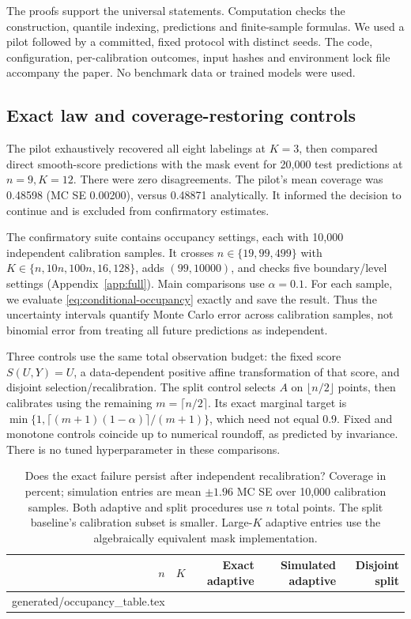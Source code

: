 \documentclass{article}
\makeatletter
\newcommand{\inputtable}[1]{\@@input#1 }
\makeatother
\begin{document}
The proofs support the universal statements. Computation checks the construction, quantile indexing, predictions and finite-sample formulas. We used a pilot followed by a committed, fixed protocol with distinct seeds. The code, configuration, per-calibration outcomes, input hashes and environment lock file accompany the paper. No benchmark data or trained models were used.

\subsection{Exact law and coverage-restoring controls}

The pilot exhaustively recovered all eight labelings at $K=3$, then compared direct smooth-score predictions with the mask event for 20,000 test predictions at $n=9,K=12$. There were zero disagreements. The pilot's mean coverage was 0.48598 (MC SE 0.00200), versus 0.48871 analytically. It informed the decision to continue and is excluded from confirmatory estimates.

The confirmatory suite contains \NumOccupancyCases{} occupancy settings, each with 10,000 independent calibration samples. It crosses $n\in\{19,99,499\}$ with $K\in\{n,10n,100n,16,128\}$, adds $(99,10000)$, and checks five boundary/level settings (Appendix~\ref{app:full}). Main comparisons use $\alpha=0.1$. For each sample, we evaluate \cref{eq:conditional-occupancy} exactly and save the result. Thus the uncertainty intervals quantify Monte Carlo error across calibration samples, not binomial error from treating all future predictions as independent.

Three controls use the same total observation budget: the fixed score $S(U,Y)=U$, a data-dependent positive affine transformation of that score, and disjoint selection/recalibration. The split control selects $A$ on $\lfloor n/2\rfloor$ points, then calibrates using the remaining $m=\lceil n/2\rceil$. Its exact marginal target is $\min\{1,\lceil(m+1)(1-\alpha)\rceil/(m+1)\}$, which need not equal 0.9. Fixed and monotone controls coincide up to numerical roundoff, as predicted by invariance. There is no tuned hyperparameter in these comparisons.

\begin{table}[t]
\caption{Does the exact failure persist after independent recalibration? Coverage in percent; simulation entries are mean $\pm1.96$ MC SE over 10,000 calibration samples. Both adaptive and split procedures use $n$ total points. The split baseline's calibration subset is smaller. Large-$K$ adaptive entries use the algebraically equivalent mask implementation.}
\label{tab:occupancy}\centering
\begin{tabular}{rrrrr}
\toprule
$n$ & $K$ & Exact adaptive & Simulated adaptive & Disjoint split \\
\midrule
\inputtable{generated/occupancy_table.tex}
\bottomrule
\end{tabular}
\end{table}
\end{document}
